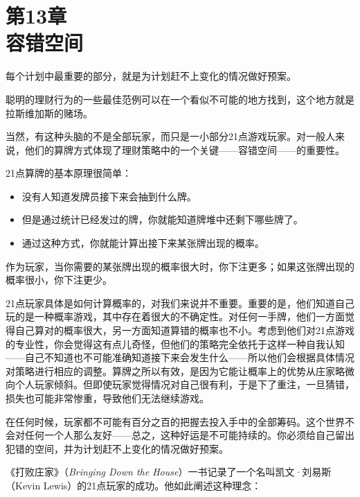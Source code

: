 
\section[第13章\q 容错空间]{第13章\\ 容错空间}

{\kaishu

每个计划中最重要的部分，就是为计划赶不上变化的情况做好预案。

}

聪明的理财行为的一些最佳范例可以在一个看似不可能的地方找到，这个地方就是拉斯维加斯的赌场。

当然，有这种头脑的不是全部玩家，而只是一小部分21点游戏玩家。对一般人来说，他们的算牌方式体现了理财策略中的一个关键——容错空间——的重要性。

21点算牌的基本原理很简单：

\begin{itemize}

\item 没有人知道发牌员接下来会抽到什么牌。

\item 但是通过统计已经发过的牌，你就能知道牌堆中还剩下哪些牌了。

\item 通过这种方式，你就能计算出接下来某张牌出现的概率。

\end{itemize}

作为玩家，当你需要的某张牌出现的概率很大时，你下注更多；如果这张牌出现的概率很小，你下注更少。

21点玩家具体是如何计算概率的，对我们来说并不重要。重要的是，他们知道自己玩的是一种概率游戏，其中存在着很大的不确定性。对任何一手牌，他们一方面觉得自己算对的概率很大，另一方面知道算错的概率也不小。考虑到他们对21点游戏的专业性，你会觉得这有点儿奇怪，但他们的策略完全依托于这样一种自我认知——自己不知道也不可能准确知道接下来会发生什么——所以他们会根据具体情况对策略进行相应的调整。算牌之所以有效，是因为它能让概率上的优势从庄家略微向个人玩家倾斜。但即使玩家觉得情况对自己很有利，于是下了重注，一旦猜错，损失也可能非常惨重，导致他们无法继续游戏。

在任何时候，玩家都不可能有百分之百的把握去投入手中的全部筹码。这个世界不会对任何一个人那么友好——总之，这种好运是不可能持续的。你必须给自己留出犯错的空间，并为计划赶不上变化的情况做好预案。

《打败庄家》（\textit{Bringing Down the House}）一书记录了一个名叫凯文·刘易斯（Kevin Lewis）的21点玩家的成功。他如此阐述这种理念：

